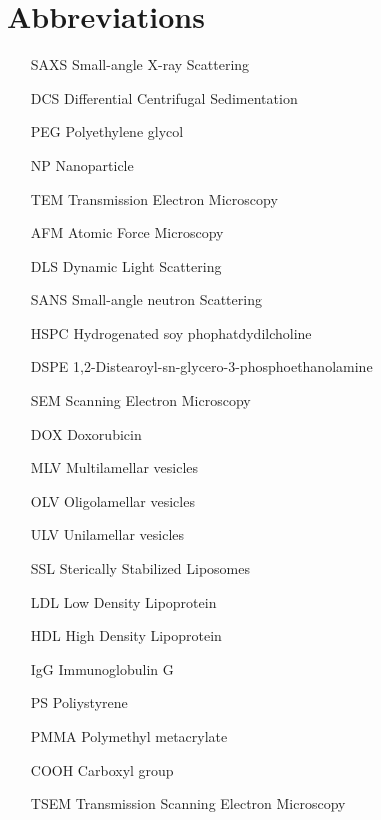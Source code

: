 \section*{Abbreviations}

\thispagestyle{empty}

\begin{itemize}
        \item   [SAXS] Small-angle X-ray Scattering
        \item   [DCS] Differential Centrifugal Sedimentation
        \item   [PEG] Polyethylene glycol
        \item   [NP] Nanoparticle
        \item   [TEM] Transmission Electron Microscopy
        \item   [AFM] Atomic Force Microscopy
        \item   [DLS] Dynamic Light Scattering
        \item   [SANS] Small-angle neutron Scattering
        \item   [HSPC] Hydrogenated soy phophatdydilcholine
        \item   [DSPE] 1,2-Distearoyl-sn-glycero-3-phosphoethanolamine
        \item   [SEM] Scanning Electron Microscopy
        \item   [DOX] Doxorubicin        
        \item   [MLV] Multilamellar vesicles
        \item   [OLV] Oligolamellar vesicles
        \item   [ULV] Unilamellar vesicles
        \item   [SSL] Sterically Stabilized Liposomes
        \item   [LDL] Low Density Lipoprotein
        \item   [HDL] High Density Lipoprotein
        \item   [IgG] Immunoglobulin G
        \item   [PS] Poliystyrene
        \item   [PMMA] Polymethyl metacrylate
        \item   [COOH] Carboxyl group
        \item   [TSEM] Transmission Scanning Electron Microscopy
        

\end{itemize}
